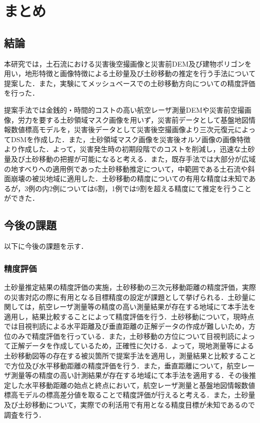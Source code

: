 \chapter{まとめ}
  \section{結論}
    本研究では，土石流における災害後空撮画像と災害前DEM及び建物ポリゴンを用い，地形特徴と画像特徴による土砂量及び土砂移動の推定を行う手法について提案した．また，実験にてメッシュベースでの土砂移動方向についての精度評価を行った．

    提案手法では金銭的・時間的コストの高い航空レーザ測量DEMや災害前空撮画像，労力を要する土砂領域マスク画像を用いず，災害前データとして基盤地図情報数値標高モデルを，災害後データとして災害後空撮画像より三次元復元によってDSMを作成した．また，土砂領域マスク画像を災害後オルソ画像の画像特徴より作成した．よって，災害発生時の初期段階でのコストを削減し，迅速な土砂量及び土砂移動の把握が可能になると考える．また，既存手法では大部分が広域の地すべりへの適用例であった土砂移動推定について，中範囲である土石流や斜面崩壊の被災地域に適用した．土砂移動の精度についての有用な精度は未知であるが，3例の内2例については6割，1例では9割を超える精度にて推定を行うことができた．


  \section{今後の課題}
    以下に今後の課題を示す．


    \subsection*{精度評価}
      土砂量推定結果の精度評価の実施，土砂移動の三次元移動距離の精度評価，実際の災害対応の際に有用となる目標精度の設定が課題として挙げられる．土砂量に関しては，航空レーザ測量等の精度の高い測量結果が存在する地域にて本手法を適用し，結果比較することによって精度評価を行う．土砂移動について，現時点では目視判読による水平距離及び垂直距離の正解データの作成が難しいため，方位のみで精度評価を行っている．また，土砂移動の方位について目視判読によって正解データを作成しているため，正確性に欠ける．よって，現地測量等による土砂移動図等の存在する被災箇所で提案手法を適用し，測量結果と比較することで方位及び水平移動距離の精度評価を行う．また，垂直距離について，航空レーザ測量等の精度の高い計測結果が存在する地域にて本手法を適用する．その後推定した水平移動距離の始点と終点において，航空レーザ測量と基盤地図情報数値標高モデルの標高差分値を取ることで精度評価が行えると考える．また，土砂量及び土砂移動について，実際での利活用で有用となる精度目標が未知であるので調査を行う．


